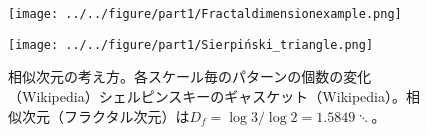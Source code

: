 \documentclass[autodetect-engine,dvi=dvipdfmx,a4paper,ja=standard,oneside,openany,11pt,draft]{bxjsbook}
\begin{document}
\begin{figure}[htbp]
  \begin{minipage}{0.45\textwidth}
    \centering
    \subcaption{}
    \texttt{[image: ../../figure/part1/Fractaldimensionexample.png]}
    \label{fig:相似次元の考え方}
  \end{minipage}
  \begin{minipage}{0.45\textwidth}
    \centering
    \subcaption{}
    \texttt{[image: ../../figure/part1/Sierpiński\_triangle.png]}
    \label{fig:シェルピンスキーのギャスケット}
  \end{minipage}
  \caption{相似次元の考え方。各スケール毎のパターンの個数の変化（Wikipedia）シェルピンスキーのギャスケット（Wikipedia）。相似次元（フラクタル次元）は$D_f=\log 3/\log 2=1.5849\ddots$。}
  \label{fig:fractal_stracture}
\end{figure}

\ifdraft{
  
  
}{}
\end{document}
